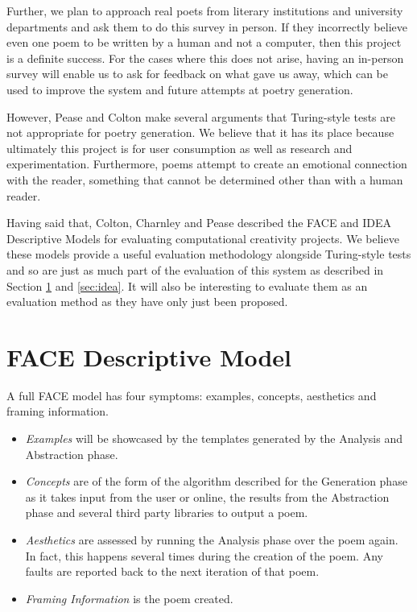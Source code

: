 Further, we plan to approach real poets from literary institutions and university departments and ask them to do this survey in person. If they incorrectly believe even one poem to be written by a human and not a computer, then this project is a definite success. For the cases where this does not arise, having an in-person survey will enable us to ask for feedback on what gave us away, which can be used to improve the system and future attempts at poetry generation.

However, Pease and Colton\cite{pease2011impact} make several arguments that Turing-style tests are not appropriate for poetry generation. We believe that it has its place because ultimately this project is for user consumption as well as research and experimentation. Furthermore, poems attempt to create an emotional connection with the reader, something that cannot be determined other than with a human reader.

Having said that, Colton, Charnley and Pease\cite{colton2011computational} described the FACE and IDEA Descriptive Models for evaluating computational creativity projects. We believe these models provide a useful evaluation methodology alongside Turing-style tests and so are just as much part of the evaluation of this system as described in Section \ref{sec:face} and \ref{sec:idea}. It will also be interesting to evaluate them as an evaluation method as they have only just been proposed.

\section{FACE Descriptive Model}
\label{sec:face}
A full FACE model has four symptoms: examples, concepts, aesthetics and framing information.

\begin{itemize}
\setlength{\itemsep}{0pt}
\item{\emph{Examples} will be showcased by the templates generated by the Analysis and Abstraction phase.}
\item{\emph{Concepts} are of the form of the algorithm described for the Generation phase as it takes input from the user or online, the results from the Abstraction phase and several third party libraries to output a poem.}
\item{\emph{Aesthetics} are assessed by running the Analysis phase over the poem again. In fact, this happens several times during the creation of the poem. Any faults are reported back to the next iteration of that poem.}
\item{\emph{Framing Information} is the poem created.}
\end{itemize}

